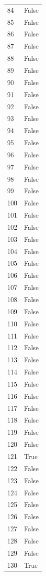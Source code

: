 \documentclass[
  letterpaper,
  DIV=11,
  numbers=noendperiod]{scrreprt}
\begin{document}
\begin{tabular}{ll}
84  &  False \\
85  &  False \\
86  &  False \\
87  &  False \\
88  &  False \\
89  &  False \\
90  &  False \\
91  &  False \\
92  &  False \\
93  &  False \\
94  &  False \\
95  &  False \\
96  &  False \\
97  &  False \\
98  &  False \\
99  &  False \\
100 &  False \\
101 &  False \\
102 &  False \\
103 &  False \\
104 &  False \\
105 &  False \\
106 &  False \\
107 &  False \\
108 &  False \\
109 &  False \\
110 &  False \\
111 &  False \\
112 &  False \\
113 &  False \\
114 &  False \\
115 &  False \\
116 &  False \\
117 &  False \\
118 &  False \\
119 &  False \\
120 &  False \\
121 &   True \\
122 &  False \\
123 &  False \\
124 &  False \\
125 &  False \\
126 &  False \\
127 &  False \\
128 &  False \\
129 &  False \\
130 &   True \\

\end{tabular}
\end{document}

